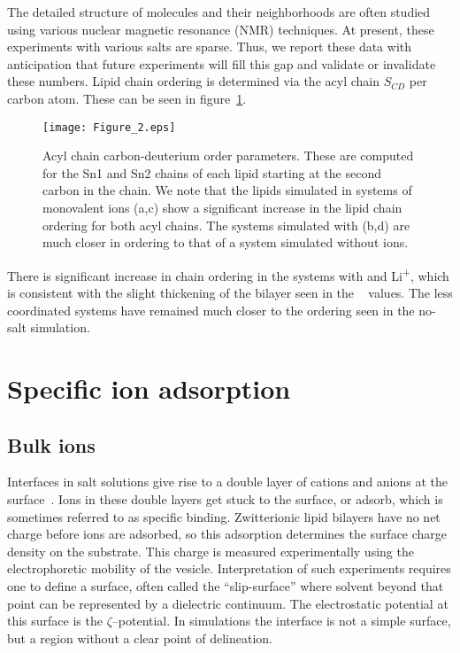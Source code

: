 The detailed structure of molecules and their neighborhoods are often studied using 
various nuclear magnetic resonance (NMR) techniques.
{At present, these experiments with various salts are sparse.}
{Thus,} we report these data with anticipation that future experiments will fill this gap and validate
or invalidate
these numbers.
Lipid chain ordering is determined via the acyl chain $S_{CD}$ per carbon
atom. These can be seen in figure~\ref{figch3:op}. 
\begin{figure}[H]
    \caption[Acyl chain order parameters]{Acyl chain carbon-deuterium order parameters. These are computed for the Sn1 and Sn2 chains of each lipid starting at the 
        second carbon in the chain\cite{egberts:1988,Douliez:1995}. We note that the lipids simulated in systems of monovalent ions (a,c) show a significant increase
in the lipid chain ordering for both acyl chains. The systems simulated with \mg (b,d) are much closer in ordering to that of a system
simulated without ions.}
    \label{figch3:op}
    \texttt{[image: Figure\_2.eps]}
\end{figure}

There is significant increase in chain ordering in the systems 
with \na and Li\textsuperscript{+}, which {is} consistent with the slight thickening
of the bilayer seen in the \db~ values. The less coordinated \mg systems have remained much closer to the 
ordering seen in the no-salt simulation.


\section{Specific ion adsorption}
\subsection{Bulk ions}

Interfaces in salt solutions give rise to a double layer of cations and anions at the surface~\cite{israelachvili:2011:intermol}. 
Ions in these double layers get stuck to the surface, or adsorb, which is sometimes referred to as specific binding. Zwitterionic lipid bilayers have no net charge before ions are adsorbed,
so this adsorption
determines the surface charge density on the substrate. This charge is measured experimentally using the electrophoretic mobility of the vesicle. Interpretation
of such experiments requires one to define a surface, often called the ``slip-surface'' where solvent 
beyond that point
can be represented by a dielectric continuum. The electrostatic potential at this surface is the $\zeta$--potential.
In simulations the interface is not a simple surface, but a region {without a clear point of delineation}. 

